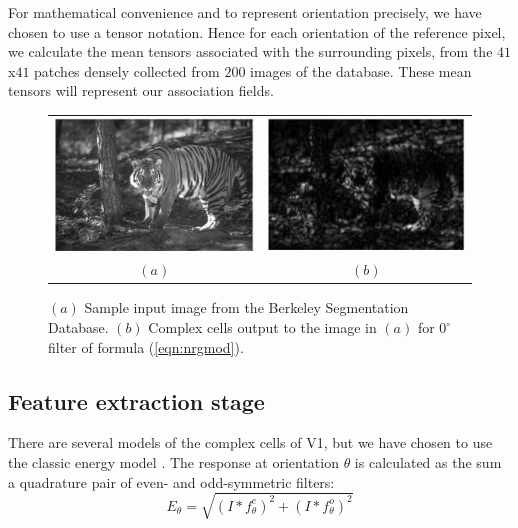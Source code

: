 \documentclass{llncs}
\begin{document}
For mathematical convenience and to represent orientation precisely, 
we have chosen to use a tensor notation. Hence for each orientation of the
reference pixel, we calculate the mean tensors associated with the 
surrounding pixels, from the $41$x$41$ patches densely collected from $200$
images of the database.
These mean tensors will represent our association fields.

\begin{figure}[t]
	\begin{center}
		\begin{tabular}{cc}
			\includegraphics[width=0.4\linewidth]{./figs/af/esempio} &
			\includegraphics[width=0.4\linewidth]{./figs/af/esempio_fil} \\
			$(a)$ & $(b)$
		\end{tabular}
    \caption{$(a)$ Sample input image from the Berkeley Segmentation Database.
     $(b)$ Complex cells output to the image in $(a)$ for $0^\circ$ filter of formula (\ref{eqn:nrgmod}).}
    \label{fig:exampleimg}
	\end{center}
\end{figure}

\subsection{Feature extraction stage}
\label{sec:ass_feature}
There are several models of the complex cells of V1, but we have chosen to
use the classic energy model \cite{Morrone88}.
The response at orientation $\theta$ is calculated as the sum a quadrature pair
of even- and odd-symmetric filters:
\begin{equation} \label{eqn:nrgmod}
E_\theta=\sqrt{\left(I*f^{e}_\theta \right)^2+\left(I*f^{o}_\theta \right)^2}
\end{equation}
\end{document}
